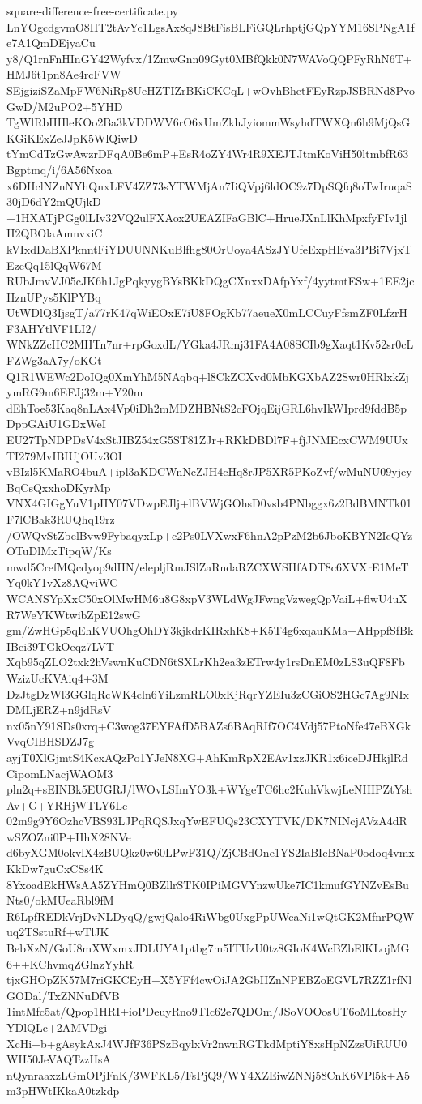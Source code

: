 \documentclass[11pt]{article}
\theoremstyle{definition}
\theoremstyle{remark}
\begin{document}
\begin{filecontents*}[overwrite]{square-difference-free-certificate.py}
LnYOgcdgvmO8IIT2tAvYc1LgsAx8qJ8BtFisBLFiGQLrhptjGQpYYM16SPNgA1fe7A1QmDEjyaCu
y8/Q1rnFnHInGY42Wyfvx/1ZmwGnn09Gyt0MBfQkk0N7WAVoQQPFyRhN6T+HMJ6t1pn8Ae4rcFVW
SEjgiziSZaMpFW6NiRp8UeHZTIZrBKiCKCqL+wOvhBhetFEyRzpJSBRNd8PvoGwD/M2uPO2+5YHD
TgWlRbHHleKOo2Ba3kVDDWV6rO6xUmZkhJyiommWsyhdTWXQn6h9MjQsGKGiKExZeJJpK5WlQiwD
tYmCdTzGwAwzrDFqA0Be6mP+EsR4oZY4Wr4R9XEJTJtmKoViH50ltmbfR63Bgptmq/i/6A56Nxoa
x6DHclNZnNYhQnxLFV4ZZ73sYTWMjAn7IiQVpj6ldOC9z7DpSQfq8oTwIruqaS30jD6dY2mQUjkD
+1HXATjPGg0lLIv32VQ2ulFXAox2UEAZIFaGBlC+HrueJXnLlKhMpxfyFIv1jlH2QBOlaAmnvxiC
kVIxdDaBXPknntFiYDUUNNKuBlfhg80OrUoya4ASzJYUfeExpHEva3PBi7VjxTEzeQq15lQqW67M
RUbJmvVJ05cJK6h1JgPqkyygBYsBKkDQgCXnxxDAfpYxf/4yytmtESw+1EE2jcHznUPys5KlPYBq
UtWDlQ3IjsgT/a77rK47qWiEOxE7iU8FOgKb77aeueX0mLCCuyFfsmZF0LfzrHF3AHYtlVF1LI2/
WNkZZcHC2MHTn7nr+rpGoxdL/YGka4JRmj31FA4A08SCIb9gXaqt1Kv52sr0cLFZWg3aA7y/oKGt
Q1R1WEWc2DoIQg0XmYhM5NAqbq+l8CkZCXvd0MbKGXbAZ2Swr0HRlxkZjymRG9m6EFJj32m+Y20m
dEhToe53Kaq8nLAx4Vp0iDh2mMDZHBNtS2cFOjqEijGRL6hvIkWIprd9fddB5pDppGAiU1GDxWeI
EU27TpNDPDsV4xStJIBZ54xG5ST81ZJr+RKkDBDl7F+fjJNMEcxCWM9UUxTI279MvIBIUjOUv3OI
vBIzl5KMaRO4buA+ipl3aKDCWnNcZJH4cHq8rJP5XR5PKoZvf/wMuNU09yjeyBqCsQxxhoDKyrMp
VNX4GIGgYuV1pHY07VDwpEJlj+lBVWjGOhsD0vsb4PNbggx6z2BdBMNTk01F7lCBak3RUQhq19rz
/OWQvStZbelBvw9FybaqyxLp+c2Ps0LVXwxF6hnA2pPzM2b6JboKBYN2IcQYzOTuDlMxTipqW/Ks
mwd5CrefMQcdyop9dHN/elepljRmJSlZaRndaRZCXWSHfADT8c6XVXrE1MeTYq0kY1vXz8AQviWC
WCANSYpXxC50xOlMwHM6u8G8xpV3WLdWgJFwngVzwegQpVaiL+flwU4uXR7WeYKWtwibZpE12swG
gm/ZwHGp5qEhKVUOhgOhDY3kjkdrKIRxhK8+K5T4g6xqauKMa+AHppfSfBkIBei39TGkOeqz7LVT
Xqb95qZLO2txk2hVswnKuCDN6tSXLrKh2ea3zETrw4y1rsDnEM0zLS3uQF8FbWzizUcKVAiq4+3M
DzJtgDzWl3GGlqRcWK4cln6YiLzmRLO0xKjRqrYZEIu3zCGiOS2HGc7Ag9NIxDMLjERZ+n9jdRsV
nx05nY91SDs0xrq+C3wog37EYFAfD5BAZs6BAqRIf7OC4Vdj57PtoNfe47eBXGkVvqCIBHSDZJ7g
ayjT0XlGjmtS4KcxAQzPo1YJeN8XG+AhKmRpX2EAv1xzJKR1x6iceDJHkjlRdCipomLNacjWAOM3
pln2q+sEINBk5EUGRJ/lWOvLSImYO3k+WYgeTC6hc2KuhVkwjLeNHIPZtYshAv+G+YRHjWTLY6Lc
02m9g9Y6OzhcVBS93LJPqRQSJxqYwEFUQs23CXYTVK/DK7NINcjAVzA4dRwSZOZni0P+HhX28NVe
d6byXGM0okvlX4zBUQkz0w60LPwF31Q/ZjCBdOne1YS2IaBIcBNaP0odoq4vmxKkDw7guCxCSs4K
8YxoadEkHWsAA5ZYHmQ0BZllrSTK0IPiMGVYnzwUke7IC1kmufGYNZvEsBuNts0/okMUeaRbl9fM
R6LpfREDkVrjDvNLDyqQ/gwjQalo4RiWbg0UxgPpUWcaNi1wQtGK2MfnrPQWuq2TSstuRf+wTlJK
BebXzN/GoU8mXWxmxJDLUYA1ptbg7m5ITUzU0tz8GIoK4WcBZbElKLojMG6++KChvmqZGlnzYyhR
tjxGHOpZK57M7riGKCEyH+X5YFf4cwOiJA2GbIIZnNPEBZoEGVL7RZZ1rfNlGODal/TxZNNuDfVB
1intMfc5at/Qpop1HRI+ioPDeuyRno9TIc62e7QDOm/JSoVOOosUT6oMLtosHyYDlQLc+2AMVDgi
XcHi+b+gAsykAxJ4WJfF36PSzBqylxVr2nwnRGTkdMptiY8xsHpNZzsUiRUU0WH50JeVAQTzzHsA
nQynraaxzLGmOPjFnK/3WFKL5/FsPjQ9/WY4XZEiwZNNj58CnK6VPl5k+A5m3pHWtIKkaA0tzkdp

\end{filecontents*}
\end{document}
